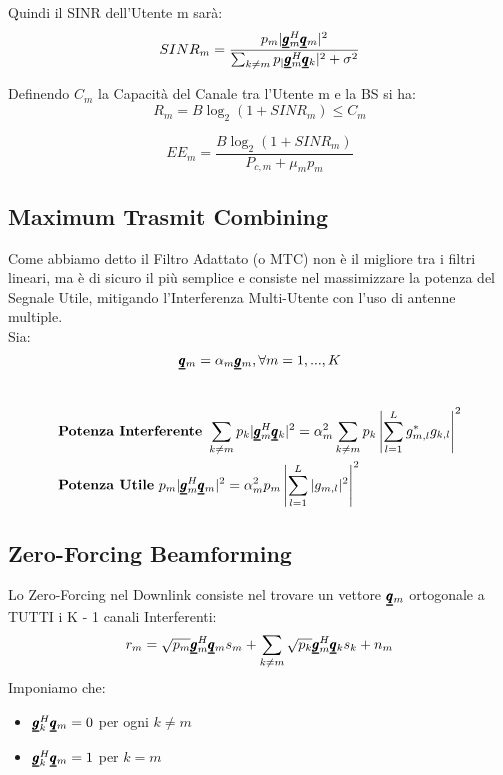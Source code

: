 Quindi il SINR dell'Utente m sarà:
\begin{equation*}
    SINR_m = \frac{p_m|\pmb{\underline{g}}_m^H\pmb{\underline{q}}_m|^2}{\sum_{k \neq m} p_ |\pmb{\underline{g}}_m^H\pmb{\underline{q}}_k|^2  +\sigma^2}
\end{equation*}

Definendo $C_m$ la Capacità del Canale tra l'Utente m e la BS si ha:
\begin{equation*}
    R_m = B\log_2 (1 + SINR_m) \leq C_m
\end{equation*}

\begin{equation*}
    EE_m = \frac{B\log_2 (1 + SINR_m)}{P_{c,m} + \mu_m p_m}
\end{equation*}


\subsection{Maximum Trasmit Combining}
Come abbiamo detto il Filtro Adattato (o MTC) non è il migliore tra i filtri lineari, ma è di sicuro il più semplice e consiste nel massimizzare la potenza del Segnale Utile, mitigando l'Interferenza Multi-Utente con l'uso di antenne multiple.\\
Sia:
\begin{equation*}
    \pmb{\underline{q}}_m = \alpha_m \pmb{\underline{g}}_m, \forall m = 1,...,K
\end{equation*}
\\
\begin{equation*}
    \begin{aligned}
     &\textbf{Potenza Interferente} \ \sum_{k \neq m} p_k |\pmb{\underline{g}}_m^H\pmb{\underline{q}}_k|^2 = \alpha_m^2 \sum_{k \neq m} p_k \left|\sum_{l=1}^L g_{m,l}^* g_{k,l}\right|^2 \\
     &\textbf{Potenza Utile} \  p_m |\pmb{\underline{g}}_m^H\pmb{\underline{q}}_m|^2 = \alpha_m^2 p_m \left|\sum_{l=1}^L |g_{m,l}|^2\right|^2
    \end{aligned}
\end{equation*}

\subsection{Zero-Forcing Beamforming}
Lo Zero-Forcing nel Downlink consiste nel trovare un vettore $\pmb{\underline{q}}_m$ ortogonale a TUTTI i K - 1 canali Interferenti:
\begin{equation*}
    r_m = \sqrt{p_m}\pmb{\underline{g}}_m^H\pmb{\underline{q}}_m s_m + \sum_{k \neq m}\sqrt{p_k} \pmb{\underline{g}}_m^H\pmb{\underline{q}}_k s_k + n_m
\end{equation*}
Imponiamo che:
\begin{itemize}
    \item $\pmb{\underline{g}}_k^H\pmb{\underline{q}}_m=0$ per ogni $k \neq m$
    \item $\pmb{\underline{g}}_k^H\pmb{\underline{q}}_m=1$ per $k = m$
\end{itemize}

